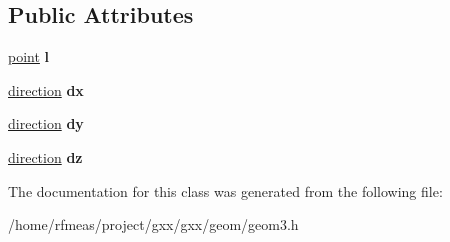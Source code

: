 \subsection*{Public Attributes}
\begin{DoxyCompactItemize}
\item 
\hyperlink{classgxx_1_1geom3_1_1point}{point} {\bfseries l}\hypertarget{classgxx_1_1geom3_1_1axis3_acaf815f5b992130f930e6e153b5c5839}{}\label{classgxx_1_1geom3_1_1axis3_acaf815f5b992130f930e6e153b5c5839}

\item 
\hyperlink{classgxx_1_1geom3_1_1direction}{direction} {\bfseries dx}\hypertarget{classgxx_1_1geom3_1_1axis3_a93d1340ebbf0c155bc6b8eb0ecfdaab4}{}\label{classgxx_1_1geom3_1_1axis3_a93d1340ebbf0c155bc6b8eb0ecfdaab4}

\item 
\hyperlink{classgxx_1_1geom3_1_1direction}{direction} {\bfseries dy}\hypertarget{classgxx_1_1geom3_1_1axis3_abd942ab6e426e41dcae1edb8ce790d3f}{}\label{classgxx_1_1geom3_1_1axis3_abd942ab6e426e41dcae1edb8ce790d3f}

\item 
\hyperlink{classgxx_1_1geom3_1_1direction}{direction} {\bfseries dz}\hypertarget{classgxx_1_1geom3_1_1axis3_adc94694684edd334578748efb4b44068}{}\label{classgxx_1_1geom3_1_1axis3_adc94694684edd334578748efb4b44068}

\end{DoxyCompactItemize}


The documentation for this class was generated from the following file\+:\begin{DoxyCompactItemize}
\item 
/home/rfmeas/project/gxx/gxx/geom/geom3.\+h\end{DoxyCompactItemize}
